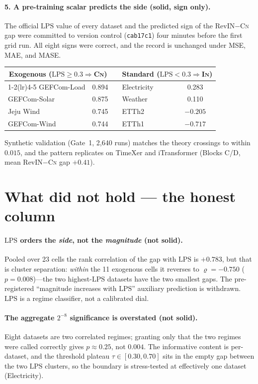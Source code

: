 \documentclass{article}
\newcommand{\lps}{\ensuremath{\mathrm{LPS}}}
\newcommand{\inm}{\textsc{In}}
\newcommand{\cnm}{\textsc{Cn}}
\newcommand{\good}{\textcolor{green!55!black}{\textbf{solid}}}
\newcommand{\bad}{\textcolor{red!75!black}{\textbf{not solid}}}
\begin{document}
\paragraph{5. A pre-training scalar predicts the side (\good, sign only).}
The official \lps{} value of every dataset and the predicted sign of the
RevIN$-$\cnm{} gap were committed to version control (\texttt{cab17c1}) four
minutes before the first grid run. All eight signs were correct, and the record
is unchanged under MSE, MAE, and MASE.

\begin{center}\small
\begin{tabular}{lc c lc}
\toprule
\multicolumn{2}{c}{Exogenous ($\lps\!\ge\!0.3\Rightarrow$\cnm)} & &
\multicolumn{2}{c}{Standard ($\lps\!<\!0.3\Rightarrow$\inm)}\\
\cmidrule(lr){1-2}\cmidrule(lr){4-5}
GEFCom-Load & 0.894 & & Electricity & 0.283 \\
GEFCom-Solar & 0.875 & & Weather & 0.110 \\
Jeju Wind & 0.745 & & ETTh2 & $-0.205$ \\
GEFCom-Wind & 0.744 & & ETTh1 & $-0.717$ \\
\bottomrule
\end{tabular}
\end{center}

\noindent Synthetic validation (Gate~1, 2{,}640 runs) matches the theory
crossings to within $0.015$, and the pattern replicates on TimeXer and
iTransformer (Blocks C/D, mean RevIN$-$\cnm{} gap $+0.41$).

\section{What did not hold --- the honest column}

\paragraph{\lps{} orders the \emph{side}, not the \emph{magnitude} (\bad).}
Pooled over 23 cells the rank correlation of the gap with \lps{} is $+0.783$,
but that is cluster separation: \emph{within} the 11 exogenous cells it reverses
to $\varrho=-0.750$ ($p=0.008$)---the two highest-\lps{} datasets have the two
smallest gaps. The pre-registered ``magnitude increases with \lps'' auxiliary
prediction is withdrawn. \lps{} is a regime classifier, not a calibrated dial.

\paragraph{The aggregate $2^{-8}$ significance is overstated (\bad).}
Eight datasets are two correlated regimes; granting only that the two regimes
were called correctly gives $p\approx0.25$, not $0.004$. The informative content
is per-dataset, and the threshold plateau $\tau\in[0.30,0.70]$ sits in the empty
gap between the two \lps{} clusters, so the boundary is stress-tested at
effectively one dataset (Electricity).
\end{document}
